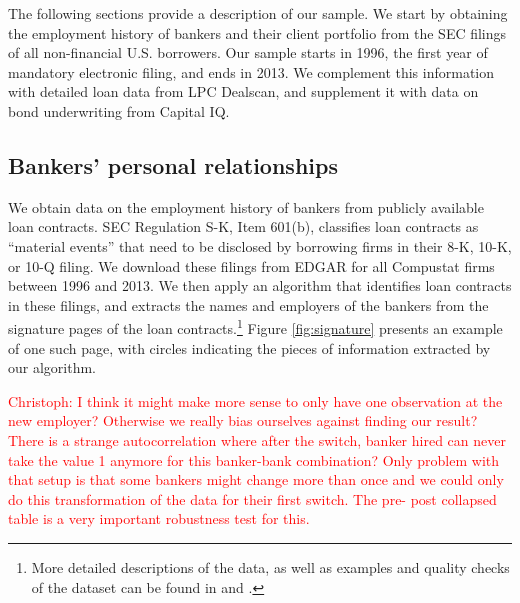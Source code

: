 
The following sections provide a description of our sample. We start by obtaining the employment history of bankers and their client portfolio from the SEC filings of all non-financial U.S. borrowers. Our sample starts in 1996, the first year of mandatory electronic filing, and ends in 2013.  We complement this information with detailed loan data from LPC Dealscan, and supplement it with data on bond underwriting from Capital IQ. %

\subsection{Bankers' personal relationships}

We obtain data on the employment history of bankers from publicly available loan contracts. SEC Regulation S-K, Item 601(b), classifies loan contracts as ``material events'' that need to be disclosed by borrowing firms in their 8-K, 10-K, or 10-Q filing. We download these filings from EDGAR for all Compustat firms between 1996 and 2013. We then apply an algorithm that identifies loan contracts in these filings, and extracts the names and employers of the bankers from the signature pages of the loan contracts.\footnote{More detailed descriptions of the data, as well as examples and quality checks of the dataset can be found in \cite{Herpfer.2018} and \cite{Gao.2018b}.} Figure \ref{fig:signature} presents an example of one such page, with circles indicating the pieces of information extracted by our algorithm.

\textcolor{red}{Christoph: I think it might make more sense to only have one observation at the new employer? Otherwise we really bias ourselves against finding our result? There is a strange autocorrelation where after the switch, banker hired can never take the value 1 anymore for this banker-bank combination? Only problem with that setup is that some bankers might change more than once and we could only do this transformation of the data for their first switch. The pre- post collapsed table is a very important robustness test for this. }

